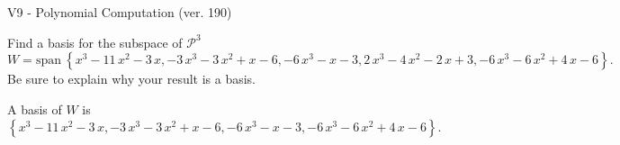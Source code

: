 \begin{exercise}
  \begin{exerciseTitle}V9 - Polynomial Computation (ver. 190)\end{exerciseTitle}
  \begin{exerciseStatement}
    Find a basis for the subspace of \(\mathcal{P}^3\) 
\[W=\mathrm{span}\ \left\{x^{3} - 11 \, x^{2} - 3 \, x , -3 \, x^{3} - 3 \, x^{2} + x - 6 , -6 \, x^{3} - x - 3 , 2 \, x^{3} - 4 \, x^{2} - 2 \, x + 3 , -6 \, x^{3} - 6 \, x^{2} + 4 \, x - 6\right\}.\]
 Be sure to explain why your result is a basis.


  \end{exerciseStatement}
  \begin{exerciseAnswer}
   A basis of \(W\) is  \(\left\{x^{3} - 11 \, x^{2} - 3 \, x , -3 \, x^{3} - 3 \, x^{2} + x - 6 , -6 \, x^{3} - x - 3 , -6 \, x^{3} - 6 \, x^{2} + 4 \, x - 6\right\}\).
  


  \end{exerciseAnswer}
\end{exercise}